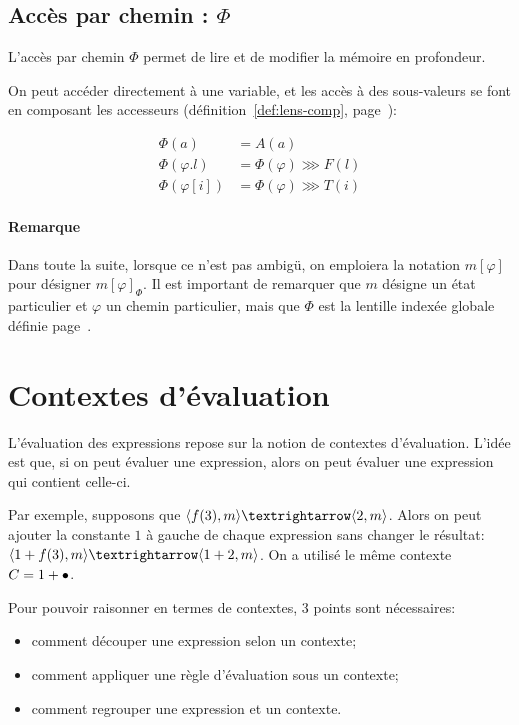 \subsection*{Accès par chemin : $Φ$}
\label{subsec:acces-phi}

  L'accès par chemin $Φ$ permet de lire et de modifier la mémoire en profondeur.

  On peut accéder directement à une variable, et les accès à des sous-valeurs se
  font en composant les accesseurs (définition~\ref{def:lens-comp},
  page~\pageref{def:lens-comp}):

  \begin{align*}
    Φ(a)    &= A(a) \\
    Φ(φ.l)  &= Φ(φ) \ggg F(l) \\
    Φ(φ[i]) &= Φ(φ) \ggg T(i)
  \end{align*}

\paragraph{Remarque}


Dans toute la suite, lorsque ce n'est pas ambigü, on emploiera la notation
$m[φ]$ pour désigner $m[φ]_Φ$. Il est important de remarquer que $m$ désigne un
état particulier et $φ$ un chemin particulier, mais que $Φ$ est la lentille
indexée globale définie page~\pageref{subsec:acces-phi}.

\section{Contextes d'évaluation}

L'évaluation des expressions repose sur la notion de contextes d'évaluation.
L'idée est que, si on peut évaluer une expression, alors on peut évaluer une
expression qui contient celle-ci.

Par exemple, supposons que $\mm{m}{f(3)}{m}{2}$. Alors on peut ajouter la
constante $1$ à gauche de chaque expression sans changer le résultat:
$\mm{m}{1+f(3)}{m}{1+2}$. On a utilisé le même contexte
$C = 1+\bullet$.

Pour pouvoir raisonner en termes de contextes, 3 points sont nécessaires:

\begin{itemize}
\item comment découper une expression selon un contexte;
\item comment appliquer une règle d'évaluation sous un contexte;
\item comment regrouper une expression et un contexte.
\end{itemize}

